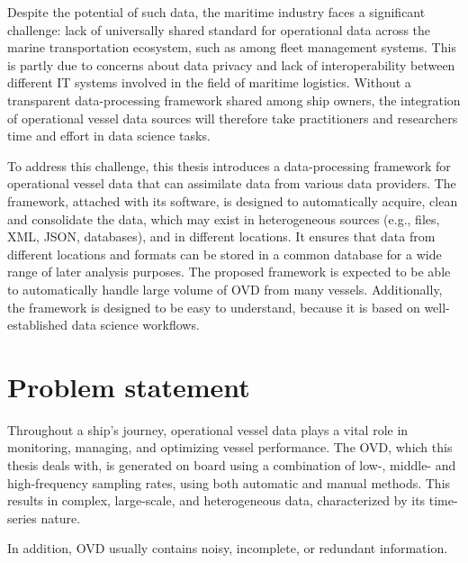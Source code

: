 Despite the potential of such data, the maritime industry faces a significant challenge: lack of universally shared standard for operational data across the marine transportation ecosystem, such as among fleet management systems. This is partly due to concerns about data privacy and lack of interoperability between different IT systems involved in the field of maritime logistics. Without a transparent data-processing framework shared among ship owners, the integration of operational vessel data sources will therefore take practitioners and researchers time and effort in data science tasks. 

To address this challenge, this thesis introduces a data-processing framework for operational vessel data that can assimilate data from various data providers. 
The framework, attached with its software, is designed to automatically acquire, clean and consolidate the data, which may exist in heterogeneous sources (e.g., files, XML, JSON, databases), and in different locations. It ensures that data from different locations and formats can be stored in a common database for a wide range of later analysis purposes. The proposed framework is expected to be able to automatically handle large volume of OVD from many vessels.
Additionally, the framework is designed to be easy to understand, because it is based on well-established data science workflows. 
\section{Problem statement}
Throughout a ship’s journey, operational vessel data plays a vital role in monitoring, managing, and optimizing vessel performance.
The OVD, which this thesis deals with, is generated on board using a combination of low-, middle- and high-frequency sampling rates, using both automatic and manual methods. This results in complex, large-scale, and heterogeneous data, characterized by its time-series nature.

In addition, OVD usually contains noisy, incomplete, or redundant information.

